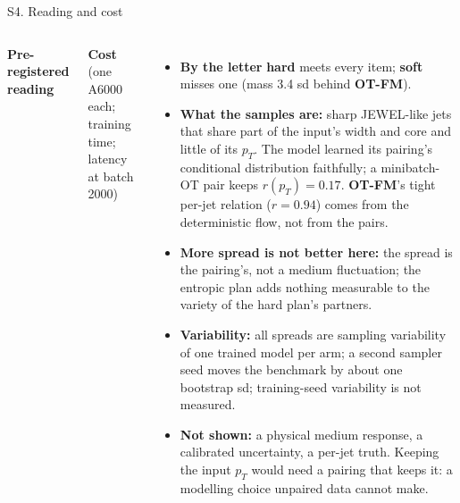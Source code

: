 \documentclass[aspectratio=169,10pt]{beamer}
\newcommand{\ot}{\textbf{OT-FM}}
\newcommand{\hda}{\textbf{hard}}
\newcommand{\sfa}{\textbf{soft}}
\begin{document}
\begin{frame}{S4. Reading and cost}
\begin{columns}[T]
\scriptsize
\textbf{Pre-registered reading}

\vspace{0.15em}


\vspace{0.5em}
\textbf{Cost} {\color{ink2}(one A6000 each; training time; latency at batch 2000)}

\vspace{0.15em}

\scriptsize
\begin{itemize}\setlength\itemsep{0.35em}
\item \textbf{By the letter} \hda{} meets every item; \sfa{} misses one (mass 3.4 sd behind \ot{}).
\item \textbf{What the samples are:} sharp JEWEL-like jets that share part of the input's width and
  core and little of its $p_T$. The model learned its pairing's conditional distribution faithfully;
  a minibatch-OT pair keeps $r(p_T) = 0.17$. \ot{}'s tight per-jet relation ($r = 0.94$) comes from the
  deterministic flow, not from the pairs.
\item \textbf{More spread is not better here:} the spread is the pairing's, not a medium fluctuation;
  the entropic plan adds nothing measurable to the variety of the hard plan's partners.
\item \textbf{Variability:} all spreads are sampling variability of one trained model per arm; a second
  sampler seed moves the benchmark by about one bootstrap sd; training-seed variability is not measured.
\item \textbf{Not shown:} a physical medium response, a calibrated uncertainty, a per-jet truth. Keeping
  the input $p_T$ would need a pairing that keeps it: a modelling choice unpaired data cannot make.
\end{itemize}
\end{columns}
\end{frame}
\end{document}

